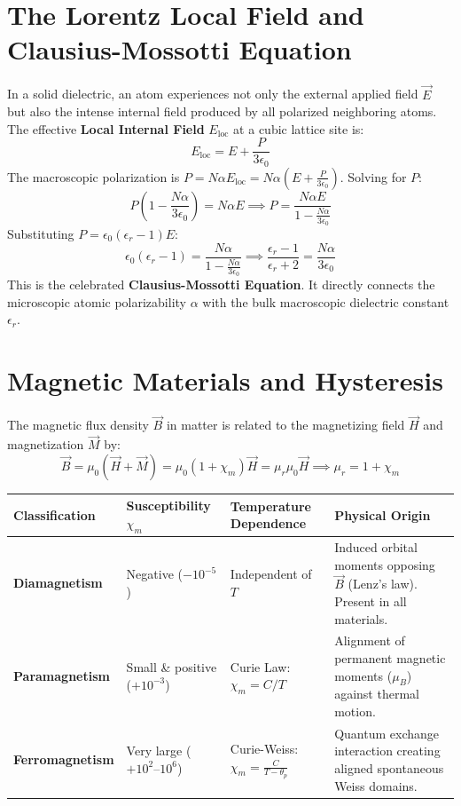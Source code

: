\section{The Lorentz Local Field and Clausius-Mossotti Equation}
In a solid dielectric, an atom experiences not only the external applied field $\vec{E}$ but also the intense internal field produced by all polarized neighboring atoms. The effective \textbf{Local Internal Field} $E_{\text{loc}}$ at a cubic lattice site is:
\begin{equation}
E_{\text{loc}} = E + \frac{P}{3\epsilon_0}
\end{equation}
The macroscopic polarization is $P = N \alpha E_{\text{loc}} = N \alpha \left( E + \frac{P}{3\epsilon_0} \right)$.
Solving for $P$:
\begin{equation}
P\left(1 - \frac{N\alpha}{3\epsilon_0}\right) = N\alpha E \implies P = \frac{N\alpha E}{1 - \frac{N\alpha}{3\epsilon_0}}
\end{equation}
Substituting $P = \epsilon_0(\epsilon_r - 1)E$:
\begin{equation}
\epsilon_0(\epsilon_r - 1) = \frac{N\alpha}{1 - \frac{N\alpha}{3\epsilon_0}} \implies \frac{\epsilon_r - 1}{\epsilon_r + 2} = \frac{N\alpha}{3\epsilon_0}
\end{equation}
This is the celebrated \textbf{Clausius-Mossotti Equation}. It directly connects the microscopic atomic polarizability $\alpha$ with the bulk macroscopic dielectric constant $\epsilon_r$.

\section{Magnetic Materials and Hysteresis}
The magnetic flux density $\vec{B}$ in matter is related to the magnetizing field $\vec{H}$ and magnetization $\vec{M}$ by:
\begin{equation}
\vec{B} = \mu_0(\vec{H} + \vec{M}) = \mu_0(1 + \chi_m)\vec{H} = \mu_r \mu_0 \vec{H} \implies \mu_r = 1 + \chi_m
\end{equation}

\begin{center}
\begin{tabularx}{\textwidth}{l l l X}
\toprule
\textbf{Classification} & \textbf{Susceptibility $\chi_m$} & \textbf{Temperature Dependence} & \textbf{Physical Origin} \\
\midrule
\textbf{Diamagnetism} & Negative ($-10^{-5}$) & Independent of $T$ & Induced orbital moments opposing $\vec{B}$ (Lenz's law). Present in all materials. \\
\textbf{Paramagnetism} & Small \& positive ($+10^{-3}$) & Curie Law: $\chi_m = C/T$ & Alignment of permanent magnetic moments ($\mu_B$) against thermal motion. \\
\textbf{Ferromagnetism} & Very large ($+10^2\text{--}10^6$) & Curie-Weiss: $\chi_m = \frac{C}{T - \theta_p}$ & Quantum exchange interaction creating aligned spontaneous Weiss domains. \\
\bottomrule
\end{tabularx}
\end{center}


